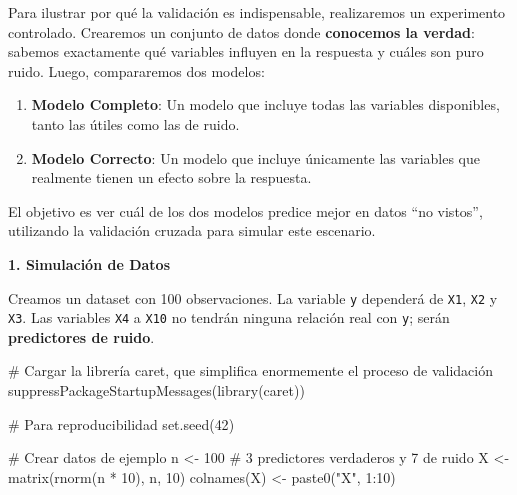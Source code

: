 \documentclass[
  letterpaper,
  DIV=11,
  numbers=noendperiod]{scrreprt}
\newenvironment{Shaded}{\begin{snugshade}}{\end{snugshade}}
\newcommand{\CommentTok}[1]{\textcolor[rgb]{0.37,0.37,0.37}{#1}}
\newcommand{\DecValTok}[1]{\textcolor[rgb]{0.68,0.00,0.00}{#1}}
\newcommand{\FunctionTok}[1]{\textcolor[rgb]{0.28,0.35,0.67}{#1}}
\newcommand{\NormalTok}[1]{\textcolor[rgb]{0.00,0.23,0.31}{#1}}
\newcommand{\OtherTok}[1]{\textcolor[rgb]{0.00,0.23,0.31}{#1}}
\newcommand{\SpecialCharTok}[1]{\textcolor[rgb]{0.37,0.37,0.37}{#1}}
\newcommand{\StringTok}[1]{\textcolor[rgb]{0.13,0.47,0.30}{#1}}
\providecommand{\tightlist}{%
  \setlength{\itemsep}{0pt}\setlength{\parskip}{0pt}}
\begin{document}
\begin{tcolorbox}[enhanced jigsaw, leftrule=.75mm, breakable, colbacktitle=quarto-callout-tip-color!10!white, bottomrule=.15mm, colframe=quarto-callout-tip-color-frame, toprule=.15mm, colback=white, coltitle=black, bottomtitle=1mm, left=2mm, title=\textcolor{quarto-callout-tip-color}{\faLightbulb}\hspace{0.5em}{La maldición del sobreajuste}, opacityback=0, arc=.35mm, opacitybacktitle=0.6, toptitle=1mm, titlerule=0mm, rightrule=.15mm]

Para ilustrar por qué la validación es indispensable, realizaremos un
experimento controlado. Crearemos un conjunto de datos donde
\textbf{conocemos la verdad}: sabemos exactamente qué variables influyen
en la respuesta y cuáles son puro ruido. Luego, compararemos dos
modelos:

\begin{enumerate}
\def\labelenumi{\arabic{enumi}.}
\tightlist
\item
  \textbf{Modelo Completo}: Un modelo que incluye todas las variables
  disponibles, tanto las útiles como las de ruido.
\item
  \textbf{Modelo Correcto}: Un modelo que incluye únicamente las
  variables que realmente tienen un efecto sobre la respuesta.
\end{enumerate}

El objetivo es ver cuál de los dos modelos predice mejor en datos ``no
vistos'', utilizando la validación cruzada para simular este escenario.

\textbf{1. Simulación de Datos}

Creamos un dataset con 100 observaciones. La variable \texttt{y}
dependerá de \texttt{X1}, \texttt{X2} y \texttt{X3}. Las variables
\texttt{X4} a \texttt{X10} no tendrán ninguna relación real con
\texttt{y}; serán \textbf{predictores de ruido}.

\begin{Shaded}
\begin{Highlighting}[]
\CommentTok{\# Cargar la librería \textquotesingle{}caret\textquotesingle{}, que simplifica enormemente el proceso de validación}
\FunctionTok{suppressPackageStartupMessages}\NormalTok{(}\FunctionTok{library}\NormalTok{(caret))}

\CommentTok{\# Para reproducibilidad}
\FunctionTok{set.seed}\NormalTok{(}\DecValTok{42}\NormalTok{)}

\CommentTok{\# Crear datos de ejemplo}
\NormalTok{n }\OtherTok{\textless{}{-}} \DecValTok{100}
\CommentTok{\# 3 predictores verdaderos y 7 de ruido}
\NormalTok{X }\OtherTok{\textless{}{-}} \FunctionTok{matrix}\NormalTok{(}\FunctionTok{rnorm}\NormalTok{(n }\SpecialCharTok{*} \DecValTok{10}\NormalTok{), n, }\DecValTok{10}\NormalTok{)}
\FunctionTok{colnames}\NormalTok{(X) }\OtherTok{\textless{}{-}} \FunctionTok{paste0}\NormalTok{(}\StringTok{"X"}\NormalTok{, }\DecValTok{1}\SpecialCharTok{:}\DecValTok{10}\NormalTok{)}


\end{Highlighting}
\end{Shaded}
\end{tcolorbox}
\end{document}

